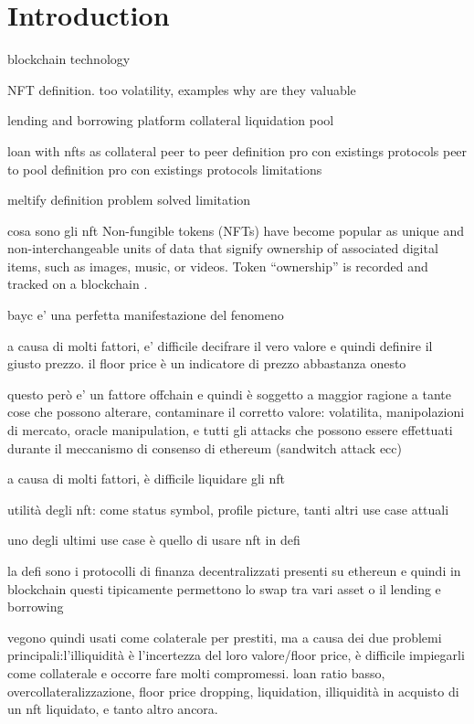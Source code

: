 \documentclass[main.tex]{subfiles}
\begin{document}
\section{Introduction}\label{sec:introduction}


blockchain technology 
    

NFT 
    definition. too volatility, 
    examples
    why are they valuable
    
lending and borrowing platform
    collateral
    liquidation
    pool 
    
loan with nfts as collateral 
    peer to peer
        definition
        pro 
        con
        existings protocols
    peer to pool
        definition
        pro
        con
        existings protocols
    limitations

meltify
    definition
    problem solved
    limitation
    


cosa sono gli nft
Non-fungible tokens (NFTs) have become popular as unique and non-interchangeable units of
data that signify ownership of associated digital items, such as images, music, or videos. Token
“ownership” is recorded and tracked on a blockchain \cite{CRS_NFT}. 

bayc e' una perfetta manifestazione del fenomeno

a causa di molti fattori, e' difficile decifrare il vero valore e quindi definire il giusto prezzo.
il floor price è un indicatore di prezzo abbastanza onesto \cite{FloorPrice}

questo però e' un fattore offchain e quindi è soggetto a maggior ragione a tante cose che possono alterare, contaminare il corretto valore: volatilita, manipolazioni di mercato, oracle manipulation, e tutti gli attacks che possono essere effettuati durante il meccanismo di consenso di ethereum (sandwitch attack ecc)

a causa di molti fattori, è difficile liquidare gli nft 

utilità degli nft:
come status symbol, profile picture, tanti altri use case attuali

uno degli ultimi use case è quello di usare nft in defi

la defi sono i protocolli di finanza decentralizzati presenti su ethereun e quindi in blockchain
questi tipicamente permettono lo swap tra vari asset o il lending e borrowing

vegono quindi usati come colaterale per prestiti, ma a causa dei due problemi principali:l'illiquidità è l'incertezza del loro valore/floor price, è difficile impiegarli come collaterale e occorre fare molti compromessi. loan ratio basso, overcollateralizzazione, floor price dropping, liquidation, illiquidità in acquisto di un nft liquidato, e tanto altro ancora.
\end{document}

